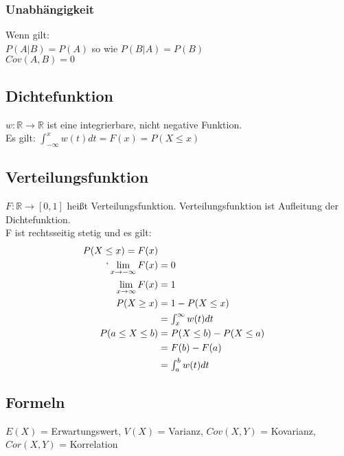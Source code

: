 \documentclass[a4paper, 8pt, landscape]{extarticle}
\newcommand{\limFromTo}[2]{ \lim\limits_{#2 \rightarrow #1}}
\let\oldint\int
\renewcommand{\int}{\ensuremath{\textstyle\oldint}}
\begin{document}
\begin{multicols*}{5}
	    	\subsubsection{Unabhängigkeit}
	    		Wenn gilt:\\
	    		$P(A|B)=P(A)$ so wie $P(B|A)=P(B)$\\
	    		$Cov(A,B)=0$

		\subsection{Dichtefunktion}
		    $w: \mathbb{R} \rightarrow \mathbb{R}$ ist eine integrierbare, nicht negative Funktion. \\
	    	Es gilt: $\int_{-\infty}^{x} w(t) dt = F(x) = P(X \leq x)$
	    \subsection{Verteilungsfunktion}
	    	$F: \mathbb{R} \rightarrow \left[0,1\right]$ heißt Verteilungsfunktion. Verteilungsfunktion ist Aufleitung der Dichtefunktion.\\
	    	F ist rechtsseitig stetig und es gilt:
	    	\begin{align*}
	    		P(X\leq x) = F(x)\\`
	    		\limFromTo{-\infty}{x} F(x) &= 0\\
	    		\limFromTo{\infty}{x} F(x) &= 1\\
	    		P(X \geq x) &= 1 - P(X \leq x) \\
	    		&= \int_{x}^{\infty} w(t)dt\\
	    		P(a \le X \le b) &= P(X \le b) - P(X \le a)\\
	    		&= F(b) - F(a) \\
	    		&= \int_{a}^{b} w(t)dt
	    	\end{align*}
	    \subsection{Formeln}
		    $E(X)$ = Erwartungswert,
		    $V(X)$ = Varianz,
		    $Cov(X,Y)$ = Kovarianz,
		    $Cor(X,Y)$ = Korrelation
		    

\end{multicols*}
\end{document}
